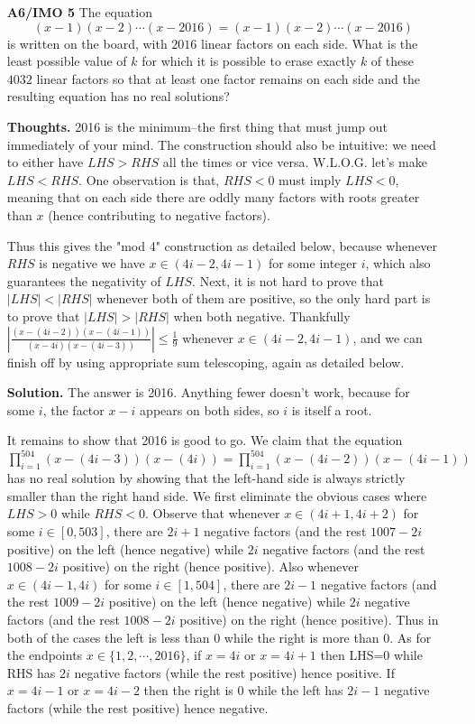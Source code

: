 \documentclass[11pt,a4paper]{article}
\begin{document}
\begin{itemize}
\item[\textbf{A6/IMO 5}]
The equation
$$(x-1)(x-2)\cdots(x-2016)=(x-1)(x-2)\cdots (x-2016)$$is written on the board, with $2016$ linear factors on each side. What is the least possible value of $k$ for which it is possible to erase exactly $k$ of these $4032$ linear factors so that at least one factor remains on each side and the resulting equation has no real solutions?

\textbf{Thoughts.} 2016 is the minimum--the first thing that must jump out immediately of your mind. 
The construction should also be intuitive: we need to either have $LHS>RHS$ all the times or vice versa. 
W.L.O.G. let's make $LHS<RHS$. One observation is that, $RHS<0$ must imply $LHS<0$, meaning that on each side there are oddly many factors with roots greater than $x$ (hence contributing to negative factors). 

Thus this gives the "mod 4" construction as detailed below, because whenever $RHS$ is negative we have $x\in (4i-2, 4i-1)$ for some integer $i$, which also guarantees the negativity of $LHS$. 
Next, it is not hard to prove that $|LHS|<|RHS|$ whenever both of them are positive, 
so the only hard part is to prove that $|LHS|>|RHS|$ when both negative. 
Thankfully $|\frac{(x-(4i-2))(x-(4i-1))}{(x-4i)(x-(4i-3))}|\le \frac 19$ whenever $x\in (4i-2, 4i-1)$, and we can finish off by using appropriate sum telescoping, again as detailed below. 

\textbf{Solution.} The answer is 2016. 
Anything fewer doesn't work, because for some $i$, the factor $x-i$ appears on both sides, 
so $i$ is itself a root. 

It remains to show that 2016 is good to go. 
We claim that the equation $\displaystyle\prod_{i=1}^{504} (x-(4i-3))(x-(4i))=\displaystyle\prod_{i=1}^{504} (x-(4i-2))(x-(4i-1))$ has no real solution by showing that the left-hand side is always strictly smaller than the right hand side. 
We first eliminate the obvious cases where $LHS>0$ while $RHS<0$. 
Observe that whenever $x\in (4i+1, 4i+2)$ for some $i\in [0, 503]$, 
there are $2i+1$ negative factors (and the rest $1007-2i$ positive) on the left (hence negative) while $2i$ negative factors (and the rest $1008-2i$ positive) on the right (hence positive). 
Also whenever $x\in (4i-1, 4i)$ for some $i\in [1, 504]$, 
there are $2i-1$ negative factors (and the rest $1009-2i$ positive) on the left (hence negative) while $2i$ negative factors (and the rest $1008-2i$ positive) on the right (hence positive). 
Thus in both of the cases the left is less than 0 while the right is more than 0. 
As for the endpoints $x\in\{1,2,\cdots ,2016\}$, if $x=4i$ or $x=4i+1$ then LHS=0 while RHS has $2i$ negative factors (while the rest positive) hence positive. 
If $x=4i-1$ or $x=4i-2$ then the right is 0 while the left has $2i-1$ negative factors (while the rest positive) hence negative. 


\end{itemize}
\end{document}
